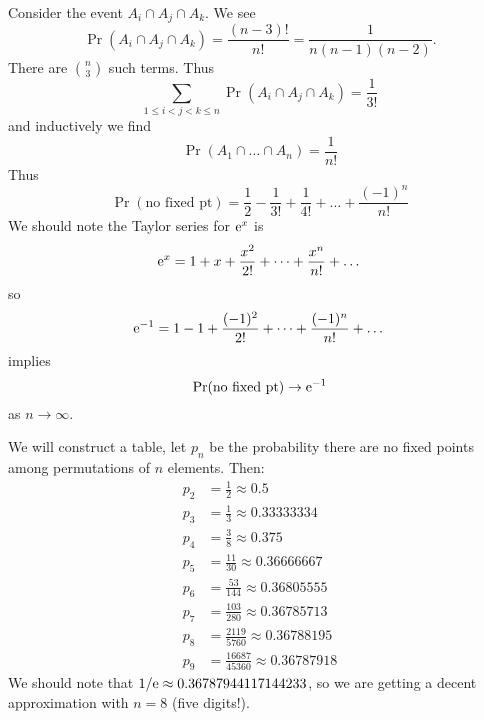 \M Consider the event $A_i\cap A_j\cap A_k$. We see
\begin{equation}
\Pr(A_i\cap A_j\cap A_k) = \frac{(n-3)!}{n!}=\frac{1}{n(n-1)(n-2)}.
\end{equation}
There are $\binom{n}{3}$ such terms. Thus
\begin{equation}
\sum_{1\leq i<j<k\leq n}\Pr(A_i\cap A_j\cap A_k)=\frac{1}{3!}
\end{equation}
and inductively we find
\begin{equation}
\Pr(A_1\cap\dots\cap A_n)=\frac{1}{n!}
\end{equation}
Thus
\begin{equation}
\Pr(\mbox{no fixed pt}) = \frac{1}{2}
- \frac{1}{3!}+\frac{1}{4!}+\dots+\frac{(-1)^{n}}{n!}
\end{equation}
We should note the Taylor series for $\mathrm{e}^{x}$ is
\begin{equation}
\mathrm{e}^{x}=1+x+\frac{x^{2}}{2!}+\dots+\frac{x^{n}}{n!}+\dots
\end{equation}
so
\begin{equation}
\mathrm{e}^{-1}=1-1+\frac{(-1)^{2}}{2!}+\dots+\frac{(-1)^{n}}{n!}+\dots
\end{equation}
implies
\begin{equation}
\mathop{\mathrm{Pr}}\nolimits(\mbox{no fixed pt})\to\mathrm{e}^{-1}
\end{equation}
as $n\to\infty$.

We will construct a table, let $p_{n}$ be the probability there are no
fixed points among permutations of $n$ elements. Then:
\begin{equation}
\begin{split}
p_2 &= \frac{1}{2} \approx 0.5\\
p_3 &= \frac{1}{3} \approx 0.33333334\\
p_4 &= \frac{3}{8} \approx 0.375\\
p_5 &= \frac{11}{30} \approx 0.36666667\\
p_6 &= \frac{53}{144} \approx 0.36805555\\ 
p_7 &= \frac{103}{280} \approx 0.36785713\\ 
p_8 &= \frac{2119}{5760} \approx 0.36788195\\ 
p_9 &= \frac{16687}{45360} \approx 0.36787918
\end{split}
\end{equation}
We should note that $1/\mathrm{e}\approx 0.36787944117144233$, so we are getting
a decent approximation with $n=8$ (five digits!).
